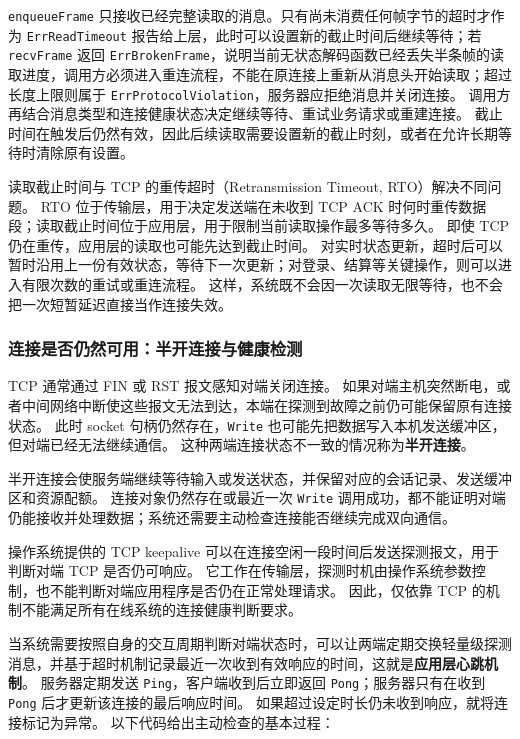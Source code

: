 \texttt{enqueueFrame} 只接收已经完整读取的消息。只有尚未消费任何帧字节的超时才作为 \texttt{ErrReadTimeout} 报告给上层，此时可以设置新的截止时间后继续等待；若 \texttt{recvFrame} 返回 \texttt{ErrBrokenFrame}，说明当前无状态解码函数已经丢失半条帧的读取进度，调用方必须进入重连流程，不能在原连接上重新从消息头开始读取；超过长度上限则属于 \texttt{ErrProtocolViolation}，服务器应拒绝消息并关闭连接。
调用方再结合消息类型和连接健康状态决定继续等待、重试业务请求或重建连接。
截止时间在触发后仍然有效，因此后续读取需要设置新的截止时刻，或者在允许长期等待时清除原有设置。

读取截止时间与 TCP 的重传超时（Retransmission Timeout, RTO）解决不同问题。
RTO 位于传输层，用于决定发送端在未收到 TCP ACK 时何时重传数据段；读取截止时间位于应用层，用于限制当前读取操作最多等待多久。
即使 TCP 仍在重传，应用层的读取也可能先达到截止时间。
对实时状态更新，超时后可以暂时沿用上一份有效状态，等待下一次更新；对登录、结算等关键操作，则可以进入有限次数的重试或重连流程。
这样，系统既不会因一次读取无限等待，也不会把一次短暂延迟直接当作连接失效。

\subsubsection{连接是否仍然可用：半开连接与健康检测}\label{sec2:half-open}

TCP 通常通过 FIN 或 RST 报文感知对端关闭连接。
如果对端主机突然断电，或者中间网络中断使这些报文无法到达，本端在探测到故障之前仍可能保留原有连接状态。
此时 socket 句柄仍然存在，\texttt{Write} 也可能先把数据写入本机发送缓冲区，但对端已经无法继续通信。
这种两端连接状态不一致的情况称为\textbf{半开连接}。

半开连接会使服务端继续等待输入或发送状态，并保留对应的会话记录、发送缓冲区和资源配额。
连接对象仍然存在或最近一次 \texttt{Write} 调用成功，都不能证明对端仍能接收并处理数据；系统还需要主动检查连接能否继续完成双向通信。

操作系统提供的 TCP keepalive 可以在连接空闲一段时间后发送探测报文，用于判断对端 TCP 是否仍可响应。
它工作在传输层，探测时机由操作系统参数控制，也不能判断对端应用程序是否仍在正常处理请求。
因此，仅依靠 TCP 的机制不能满足所有在线系统的连接健康判断要求。

当系统需要按照自身的交互周期判断对端状态时，可以让两端定期交换轻量级探测消息，并基于超时机制记录最近一次收到有效响应的时间，这就是\textbf{应用层心跳机制}。
服务器定期发送 \texttt{Ping}，客户端收到后立即返回 \texttt{Pong}；服务器只有在收到 \texttt{Pong} 后才更新该连接的最后响应时间。
如果超过设定时长仍未收到响应，就将连接标记为异常。
以下代码给出主动检查的基本过程：

